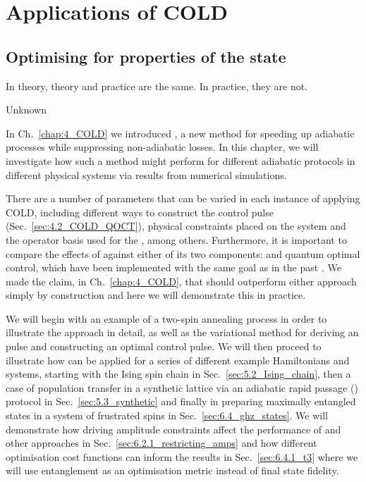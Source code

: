 \part{Applications of COLD}\label{part:applications}

\chapter{Optimising for properties of the state}\label{chap:6_Applications_fidelity}

\epigraph{In theory, theory and practice are the same. In practice, they are not.}{Unknown}

In Ch.~\ref{chap:4_COLD} we introduced , a new method for speeding up adiabatic processes while suppressing non-adiabatic losses. In this chapter, we will investigate how such a method might perform for different adiabatic protocols in different physical systems via results from numerical simulations. 

There are a number of parameters that can be varied in each instance of applying COLD, including different ways to construct the control pulse (Sec.~\ref{sec:4.2_COLD_QOCT}), physical constraints placed on the system and the operator basis used for the , among others. Furthermore, it is important to compare the effects of  against either of its two components:  and quantum optimal control, which have been implemented with the same goal as  in the past \cite{sels_minimizing_2017, glaser_training_2015, guery-odelin_shortcuts_2019}. We made the claim, in Ch.~\ref{chap:4_COLD}, that  should outperform either approach simply by construction and here we will demonstrate this in practice.

We will begin with an example of a two-spin annealing process in order to illustrate the  approach in detail, as well as the variational method for deriving an  pulse and constructing an optimal control pulse. We will then proceed to illustrate how  can be applied for a series of different example Hamiltonians and systems, starting with the Ising spin chain in Sec.~\ref{sec:5.2_Ising_chain}, then a case of population transfer in a synthetic lattice via an adiabatic rapid passage () protocol in Sec.~\ref{sec:5.3_synthetic} and finally in preparing maximally entangled states in a system of frustrated spins in Sec.~\ref{sec:6.4_ghz_states}. We will demonstrate how driving amplitude constraints affect the performance of  and other approaches in Sec.~\ref{sec:6.2.1_restricting_amps} and how different optimisation cost functions can inform the results in Sec.~\ref{sec:6.4.1_t3} where we will use entanglement as an optimisation metric instead of final state fidelity.

